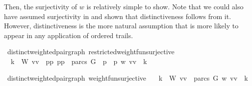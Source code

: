\begin{isabellebody}
\begin{isamarkuptext}
Then, the surjectivity of $w$ is relatively simple to show. Note that we could also have assumed surjectivity in 
 and shown that distinctiveness follows from it. However,
distinctiveness is the more natural assumption that is more likely to appear in any application
of ordered trails.%
\end{isamarkuptext}\isamarkuptrue%
\isamarkupfalse%
{\isacharparenleft}\ distinct{\isacharunderscore}weighted{\isacharunderscore}pair{\isacharunderscore}graph{\isacharparenright}\ restricted{\isacharunderscore}weight{\isacharunderscore}fun{\isacharunderscore}surjective{\isacharcolon}\ \ \isanewline
\ \ {\isachardoublequoteopen}{\isasymforall}k\ {\isasymin}\ W{\isachardot}\ {\isasymexists}{\isacharparenleft}vv\ {\isasymin}\ {\isacharbraceleft}{\isacharparenleft}p{}{\isacharcomma}p{}{\isacharparenright}{\isachardot}\ {\isacharparenleft}p{}{\isacharcomma}p{}{\isacharparenright}\ {\isasymin}\ parcs\ G\ {\isasymand}\ p{}\ {\isacharless}\ p{}{\isacharbraceright}{\isachardot}\ w\ {\isacharparenleft}vv\ {\isacharequal}\ k{\isachardoublequoteclose}%
\isadelimproof
%
\endisadelimproof
%
\isatagproof
%
\endisatagproof
{\isafoldproof}%
%
\isadelimproof
%
\endisadelimproof
%
\begin{isamarkuptext}%
%
\end{isamarkuptext}\isamarkuptrue%
\isamarkupfalse%
{\isacharparenleft}\ distinct{\isacharunderscore}weighted{\isacharunderscore}pair{\isacharunderscore}graph{\isacharparenright}\ weight{\isacharunderscore}fun{\isacharunderscore}surjective{\isacharcolon}\isanewline
\ \ \ {\isachardoublequoteopen}{\isasymforall}k\ {\isasymin}\ W{\isachardot}\ {\isasymexists}{\isacharparenleft}vv\ {\isasymin}\ parcs\ G{\isachardot}\ w\ {\isacharparenleft}vv\ {\isacharequal}\ k{\isachardoublequoteclose}%
\isadelimproof
%
\endisadelimproof
%
\isatagproof
%
\endisatagproof
{\isafoldproof}%
%
\isadelimproof
%
\endisadelimproof
%
\isadelimproof
%
\endisadelimproof
%
\isatagproof
%
\endisatagproof
{\isafoldproof}%

\end{isabellebody}
